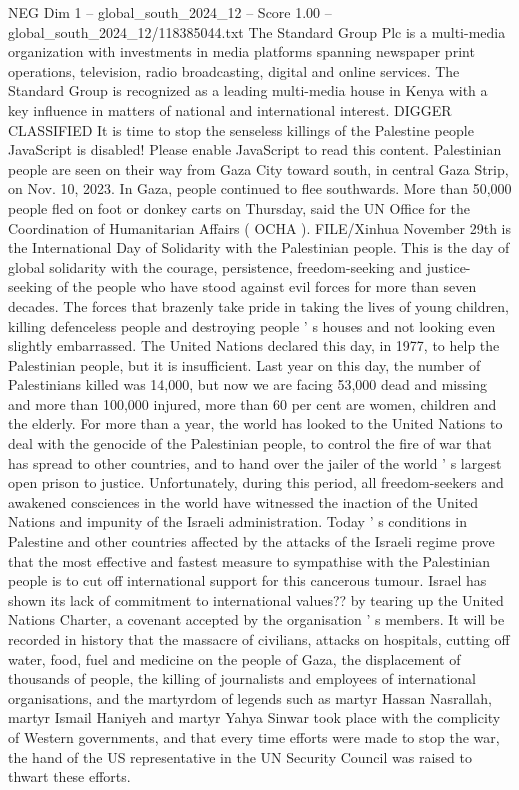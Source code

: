 \begin{textsample}{NEG Dim 1 – global\_south\_2024\_12 – Score 1.00 – global\_south\_2024\_12/118385044.txt}  \label{ex:f1_neg_264}
The Standard Group Plc is a multi-media organization with investments in media platforms spanning newspaper print operations, television, radio broadcasting, digital and online services.
The Standard Group is recognized as a leading multi-media house in Kenya with a key influence in matters of national and international interest.
DIGGER CLASSIFIED It is time to stop the senseless killings of the Palestine people JavaScript is disabled!
Please enable JavaScript to read this content.
Palestinian people are seen on their way from Gaza City toward south, in central Gaza Strip, on Nov. 10, 2023.
In Gaza, people continued to flee southwards.
More than 50,000 people fled on foot or donkey carts on Thursday, said the UN Office for the Coordination of Humanitarian Affairs ( OCHA ).
FILE/Xinhua November 29th is the International Day of Solidarity with the Palestinian people.
This is the day of global solidarity with the courage, persistence, freedom-seeking and justice-seeking of the people who have stood against evil forces for more than seven decades.
The forces that brazenly take pride in taking the lives of young children, killing defenceless people and destroying people ' s houses and not looking even slightly embarrassed.
The United Nations declared this day, in 1977, to help the Palestinian people, but it is insufficient.
Last year on this day, the number of Palestinians killed was 14,000, but now we are facing 53,000 dead and missing and more than 100,000 injured, more than 60 per cent are women, children and the elderly.
For more than a year, the world has looked to the United Nations to deal with the genocide of the Palestinian people, to control the fire of war that has spread to other countries, and to hand over the jailer of the world ' s largest open prison to justice.
Unfortunately, during this period, all freedom-seekers and awakened consciences in the world have witnessed the inaction of the United Nations and impunity of the Israeli administration.
Today ' s conditions in Palestine and other countries affected by the attacks of the Israeli regime prove that the most effective and fastest measure to sympathise with the Palestinian people is to cut off international support for this cancerous tumour.
Israel has shown its lack of commitment to international values?? by tearing up the United Nations Charter, a covenant accepted by the organisation ' s members.
It will be recorded in history that the massacre of civilians, attacks on hospitals, cutting off water, food, fuel and medicine on the people of Gaza, the displacement of thousands of people, the killing of journalists and employees of international organisations, and the martyrdom of legends such as martyr Hassan Nasrallah, martyr Ismail Haniyeh and martyr Yahya Sinwar took place with the complicity of Western governments, and that every time efforts were made to stop the war, the hand of the US representative in the UN Security Council was raised to thwart these efforts.

\end{textsample}
